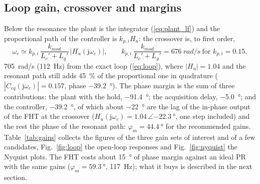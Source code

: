 \documentclass[10pt,a4paper]{scrartcl}
\newcommand{\kmod}{k_{mod}}
\newcommand{\kpi}{k_{p,i}}
\newcommand{\jj}{\mathrm{j}}
\newcommand{\Ceq}{C_{eq}}
\newcommand{\Hu}{H_u}
\begin{document}
\begin{onehalfspace}
\subsection{Loop gain, crossover and margins}
\label{sec:margins}

Below the resonance the plant is the integrator (\ref{eq:plant_lf}) and the proportional path of the controller is $\kpi\Hu$: the crossover is, to first order,
\begin{equation}
\omega_c \simeq \kpi\,\frac{\kmod}{L_c' + L_g'}\,|\Hu(\jj\omega_c)|, \qquad \kpi\,\frac{\kmod}{L_c' + L_g'} = \SI{676}{rad/s} \ \text{for } \kpi = 0.15,
\label{eq:wc}
\end{equation}
\SI{705}{rad/s} (\SI{112}{Hz}) from the exact loop (\ref{eq:loop}), where $|\Hu| = 1.04$ and the resonant path still adds \SI{45}{\percent} of the proportional one in quadrature ($|\Ceq(\jj\omega_c)| = 0.157$, phase \SI{-39.2}{\degree}). The phase margin is the sum of three contributions: the plant with the hold, \SI{-91.4}{\degree}; the acquisition delay, \SI{-5.0}{\degree}; and the controller, \SI{-39.2}{\degree}, of which about \SI{-22}{\degree} are the lag of the in-phase output of the FHT at the crossover ($\Hu(\jj\omega_c) = 1.04\,\angle\SI{-22.3}{\degree}$, one step included) and the rest the phase of the resonant path: $\varphi_m = \SI{44.4}{\degree}$ for the recommended gains. Table~\ref{tab:gains} collects the figures of the three gain sets of interest and of a few candidates, Fig.~\ref{fig:loop} the open-loop responses and Fig.~\ref{fig:nyquist} the Nyquist plots. The FHT costs about \SI{15}{\degree} of phase margin against an ideal PR with the same gains ($\varphi_m = \SI{59.3}{\degree}$, \SI{117}{Hz}); what it buys is described in the next section.


\end{onehalfspace}
\end{document}
